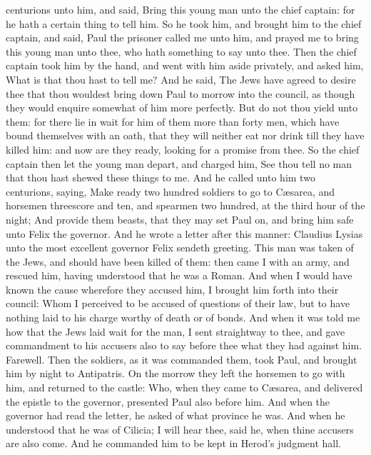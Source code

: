 centurions unto him, and said, Bring this young man unto the chief
captain: for he hath a certain thing to tell him.  So he
took him, and brought him to the chief captain, and said, Paul the
prisoner called me unto him, and prayed me to bring this young man unto
thee, who hath something to say unto thee.  Then the chief
captain took him by the hand, and went with him aside privately, and
asked him, What is that thou hast to tell me?  And he said,
The Jews have agreed to desire thee that thou wouldest bring down Paul
to morrow into the council, as though they would enquire somewhat of him
more perfectly.  But do not thou yield unto them: for there
lie in wait for him of them more than forty men, which have bound
themselves with an oath, that they will neither eat nor drink till they
have killed him: and now are they ready, looking for a promise from
thee.  So the chief captain then let the young man depart,
and charged him, See thou tell no man that thou hast shewed these things
to me.  And he called unto him two centurions, saying, Make
ready two hundred soldiers to go to Cæsarea, and horsemen threescore and
ten, and spearmen two hundred, at the third hour of the night;
 And provide them beasts, that they may set Paul on, and
bring him safe unto Felix the governor.  And he wrote a
letter after this manner:  Claudius Lysias unto the most
excellent governor Felix sendeth greeting.  This man was
taken of the Jews, and should have been killed of them: then came I with
an army, and rescued him, having understood that he was a Roman.
 And when I would have known the cause wherefore they
accused him, I brought him forth into their council:  Whom
I perceived to be accused of questions of their law, but to have nothing
laid to his charge worthy of death or of bonds.  And when
it was told me how that the Jews laid wait for the man, I sent
straightway to thee, and gave commandment to his accusers also to say
before thee what they had against him. Farewell.  Then the
soldiers, as it was commanded them, took Paul, and brought him by night
to Antipatris.  On the morrow they left the horsemen to go
with him, and returned to the castle:  Who, when they came
to Cæsarea, and delivered the epistle to the governor, presented Paul
also before him.  And when the governor had read the
letter, he asked of what province he was. And when he understood that he
was of Cilicia;  I will hear thee, said he, when thine
accusers are also come. And he commanded him to be kept in Herod's
judgment hall.

